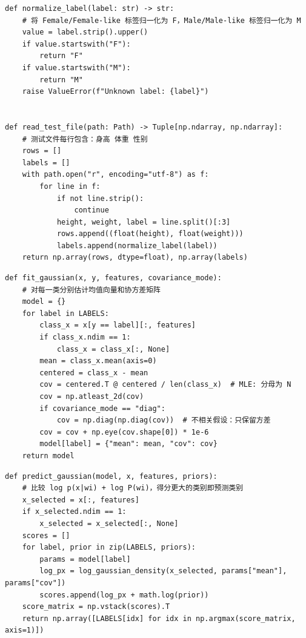\documentclass[UTF8,a4paper,12pt]{ctexart}
\begin{document}
\begin{lstlisting}[caption={Exp.1 data loading and label normalization},label={lst:exp1-data-read}]
def normalize_label(label: str) -> str:
    # 将 Female/Female-like 标签归一化为 F，Male/Male-like 标签归一化为 M
    value = label.strip().upper()
    if value.startswith("F"):
        return "F"
    if value.startswith("M"):
        return "M"
    raise ValueError(f"Unknown label: {label}")


def read_test_file(path: Path) -> Tuple[np.ndarray, np.ndarray]:
    # 测试文件每行包含：身高 体重 性别
    rows = []
    labels = []
    with path.open("r", encoding="utf-8") as f:
        for line in f:
            if not line.strip():
                continue
            height, weight, label = line.split()[:3]
            rows.append((float(height), float(weight)))
            labels.append(normalize_label(label))
    return np.array(rows, dtype=float), np.array(labels)
\end{lstlisting}

\begin{lstlisting}[caption={Exp.1 Gaussian parameter estimation},label={lst:exp1-gaussian-fit}]
def fit_gaussian(x, y, features, covariance_mode):
    # 对每一类分别估计均值向量和协方差矩阵
    model = {}
    for label in LABELS:
        class_x = x[y == label][:, features]
        if class_x.ndim == 1:
            class_x = class_x[:, None]
        mean = class_x.mean(axis=0)
        centered = class_x - mean
        cov = centered.T @ centered / len(class_x)  # MLE: 分母为 N
        cov = np.atleast_2d(cov)
        if covariance_mode == "diag":
            cov = np.diag(np.diag(cov))  # 不相关假设：只保留方差
        cov = cov + np.eye(cov.shape[0]) * 1e-6
        model[label] = {"mean": mean, "cov": cov}
    return model
\end{lstlisting}

\begin{lstlisting}[caption={Exp.1 minimum-error Bayes decision},label={lst:exp1-gaussian-predict}]
def predict_gaussian(model, x, features, priors):
    # 比较 log p(x|wi) + log P(wi)，得分更大的类别即预测类别
    x_selected = x[:, features]
    if x_selected.ndim == 1:
        x_selected = x_selected[:, None]
    scores = []
    for label, prior in zip(LABELS, priors):
        params = model[label]
        log_px = log_gaussian_density(x_selected, params["mean"], params["cov"])
        scores.append(log_px + math.log(prior))
    score_matrix = np.vstack(scores).T
    return np.array([LABELS[idx] for idx in np.argmax(score_matrix, axis=1)])
\end{lstlisting}
\end{document}
